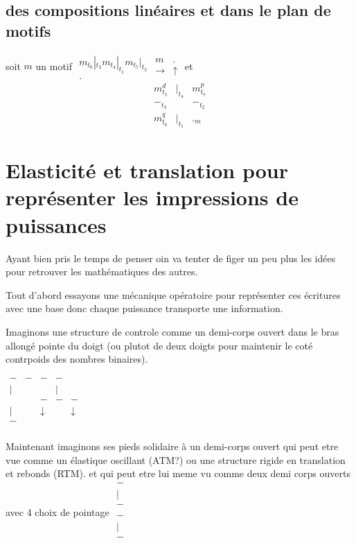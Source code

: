 \documentclass{article}
\begin{document}
\subsection{des compositions linéaires et dans le plan de motifs}
soit $m$ un motif $\begin{matrix} m_{t_6}|_{t_2}m_{t_4}|_{t_1}m_{t_5}|_{t_3} \\ .  \end{matrix} \begin{matrix} m&.\\ \rightarrow&\uparrow \end{matrix}$
et  $$\begin{matrix} m^d_{t_5} &|_{t_4}& m^p_{t_7}\\-_{t_3}&&-_{t_2}\\m^q_{t_6}&|_{t_1}&._m \end{matrix}$$

\section{Elasticité et translation pour représenter les impressions de puissances}
Ayant bien pris le temps de penser  oin va tenter  de figer un peu plus les idées pour retrouver les mathématiques des autres.

Tout d'abord essayons une mécanique opératoire pour représenter ces écritures avec une base donc chaque puissance transporte une information.

Imaginons une structure de controle comme un demi-corps ouvert dans le bras allongé pointe du doigt (ou plutot de deux doigts pour maintenir le coté contrpoids des nombres binaires).

 $\begin{matrix} 
 - & -&-&-&&\\
 |& & &  |&\\
  & &- &  - &-&\\
 |& &\downarrow &&\downarrow\\
 -&&&\\
 \end{matrix}$
 
 
 Maintenant imaginons ses pieds solidaire à  un demi-corps ouvert  qui peut  etre vue comme un élastique oscillant (ATM?) ou une structure rigide en translation et rebonds (RTM). et qui peut etre lui meme vu comme  deux  demi corps  ouverts avec 4 choix de pointage
  $\begin{matrix} 
 - & \\
 |&  \\
 -&\\
 &\\
 -&\\
 |&\\
 -&\\
 \end{matrix}$
    
\end{document}
